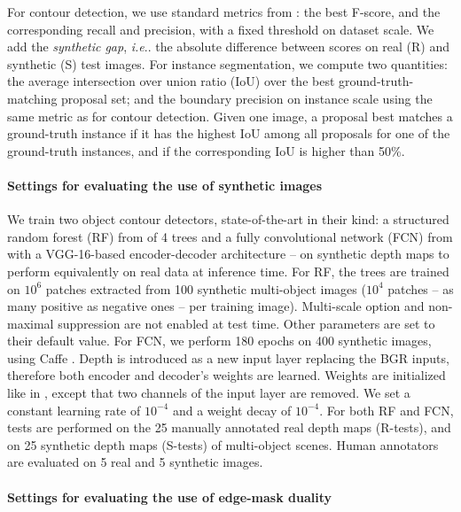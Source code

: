 \documentclass[runningheads,a4paper]{llncs}
\makeatletter
\DeclareRobustCommand\onedot{\futurelet\@let@token\@onedot}
\newcommand*\@onedot{\ifx\@let@token.\else.\null\fi\xspace}
\newcommand*\ie{\emph{i.e}\onedot} \newcommand*\Ie{\emph{I.e}\onedot}
\makeatother
\begin{document}
For contour detection, we use standard metrics from \cite{Arbelaez2011}: the best F-score, and the corresponding recall and precision, with a fixed threshold on dataset scale. We add the \emph{synthetic gap}, \ie the absolute difference between scores on real (R) and synthetic (S) test images. For instance segmentation, we compute two quantities: the average intersection over union ratio (IoU) over the best ground-truth-matching proposal set; and the boundary precision on instance scale using the same metric as for contour detection. Given one image, a proposal best matches a ground-truth instance if it has the highest IoU among all proposals for one of the ground-truth instances, and if the corresponding IoU is higher than 50\%.

\paragraph{Settings for evaluating the use of synthetic images}

We train two object contour detectors, state-of-the-art in their kind: a structured random forest (RF) from \cite{DollarZ14} of 4 trees and a fully convolutional network (FCN) from \cite{Yang2016CEDN} with a VGG-16-based encoder-decoder architecture -- on synthetic depth maps to perform equivalently on real data at inference time. For RF, the trees are trained on $10^6$ patches extracted from 100 synthetic multi-object images ($10^4$ patches -- as many positive as negative ones -- per training image). Multi-scale option and non-maximal suppression are not enabled at test time. Other parameters are set to their default value. For FCN, we perform 180 epochs on 400 synthetic images, using Caffe \cite{jia2014caffe}. Depth is introduced as a new input layer replacing the BGR inputs, therefore both encoder and decoder's weights are learned. Weights are initialized like in \cite{Yang2016CEDN}, except that two channels of the input layer are removed. We set a constant learning rate of $10^{-4}$ and a weight decay of $10^{-4}$. For both RF and FCN, tests are performed on the 25 manually annotated real depth maps (R-tests), and on 25 synthetic depth maps (S-tests) of multi-object scenes. Human annotators are evaluated on 5 real and 5 synthetic images.

\paragraph{Settings for evaluating the use of edge-mask duality}
\end{document}
